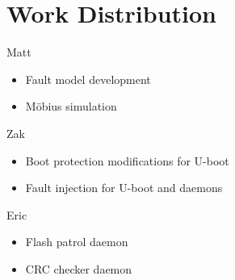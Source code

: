 \section{Work Distribution}\label{sec:team}
\noindent Matt
\begin{itemize}
  \item{Fault model development}
  \item{M\"obius simulation}
\end{itemize} 
\noindent Zak
\begin{itemize}
  \item{Boot protection modifications for U-boot}
  \item{Fault injection for U-boot and daemons}
\end{itemize}
\noindent Eric
\begin{itemize}
  \item{Flash patrol daemon}
  \item{CRC checker daemon}
\end{itemize}